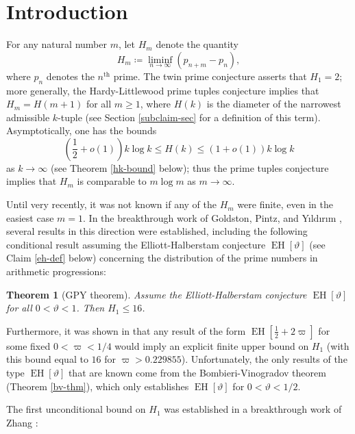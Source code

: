 \documentclass{bmcart}
\DeclareMathOperator*\EH{EH}
\theoremstyle{plain}
\newtheorem{theorem}{Theorem}[section]
\theoremstyle{definition}
\begin{document}




\section{Introduction}

For any natural number $m$, let $H_m$ denote the quantity
$$ H_m \coloneqq \liminf_{n \to \infty} (p_{n+m} - p_n),$$
where $p_n$ denotes the $n^{\operatorname{th}}$ prime.  The twin prime conjecture asserts that $H_1=2$; more generally, the Hardy-Littlewood prime tuples conjecture \cite{hardy} implies that $H_m = H(m+1)$ for all $m \geq 1$, where $H(k)$ is the diameter of the narrowest admissible $k$-tuple (see Section \ref{subclaim-sec} for a definition of this term).  Asymptotically, one has the bounds
$$ (\frac{1}{2}+o(1)) k \log k \leq H(k) \leq (1+o(1)) k \log k$$
as $k \to \infty$ (see Theorem \ref{hk-bound} below); thus the prime tuples conjecture implies that $H_m$ is comparable to $m \log m$ as $m \to \infty$.

Until very recently, it was not known if any of the $H_m$ were finite, even in the easiest case $m=1$.  In the breakthrough work of Goldston, Pintz, and Y{\i}ld{\i}r{\i}m \cite{gpy}, several results in this direction were established, including the following conditional result assuming the Elliott-Halberstam conjecture $\EH[\vartheta]$ (see Claim \ref{eh-def} below) concerning the distribution of the prime numbers in arithmetic progressions:

\begin{theorem}[GPY theorem]\label{gpy-thm}  Assume the Elliott-Halberstam conjecture $\EH[\vartheta]$ for all $0 < \vartheta < 1$.  Then $H_1 \leq 16$.
\end{theorem}

Furthermore, it was shown in \cite{gpy} that any result of the form $\EH[\frac{1}{2} + 2\varpi]$ for some fixed $0 < \varpi < 1/4$ would imply an explicit finite upper bound on $H_1$ (with this bound equal to $16$ for $\varpi > 0.229855$).  Unfortunately, the only results of the type $\EH[\vartheta]$ that are known come from the Bombieri-Vinogradov theorem (Theorem \ref{bv-thm}), which only establishes $\EH[\vartheta]$ for $0 < \vartheta < 1/2$.

The first unconditional bound on $H_1$ was established  in a breakthrough work of Zhang \cite{zhang}:
\end{document}
